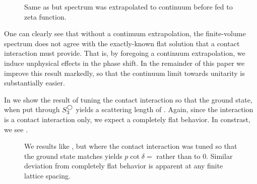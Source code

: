 \begin{figure}[th]
    
    \caption{Same as  but spectrum was extrapolated to continuum before fed to zeta function.}
    \label{fig:unimproved spherical continuum extrapolation}
\end{figure}

One can clearly see that without a continuum extrapolation, the finite-volume spectrum does not agree with the exactly-known flat solution that a contact interaction must provide.
That is, by foregoing a continuum extrapolation, we induce unphysical effects in the phase shift.
In the remainder of this paper we improve this result markedly, so that the continuum limit towards unitarity is substantially easier.


In  we show the result of tuning the contact interaction so that the ground state, when put through $S^{\bigcirc}_3$ yields a scattering length of .
Again, since the interaction is a contact interaction only, we expect a completely flat behavior.
In constrast, we see .

\begin{figure}[th]
    
    \caption{We results like , but where the contact interaction was tuned so that the ground state matches yields $p\cot\delta = $ rather than to 0.  Similar deviation from completely flat behavior is apparent at any finite lattice spacing.}
    \label{fig:finite a spherical}
\end{figure}


